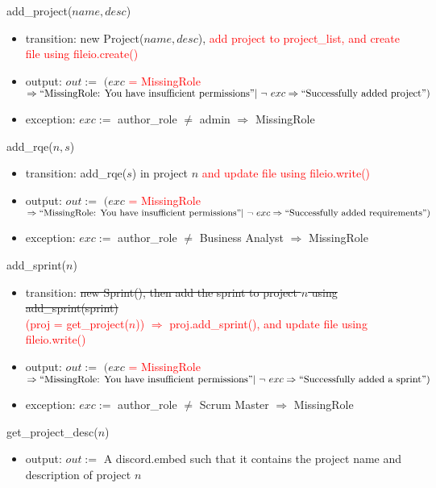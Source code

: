 \documentclass[12pt, titlepage]{article}
\begin{document}
\noindent add\_project($name, desc$)
\begin{itemize}
    \item transition: new Project($name, desc$), \textcolor{red}{add project to project\_list, and create file using fileio.create()}
    \item output: $out :=$ $(exc$ \textcolor{red}{= MissingRole} $\Rightarrow ``\text{MissingRole: You have insufficient permissions}"\\ |\ \lnot\ exc \Rightarrow ``\text{Successfully added project}")$
    \item exception: $exc :=$ author\_role $\neq$ admin $\Rightarrow$ MissingRole
\end{itemize}

\noindent add\_rqe($n, s$)
\begin{itemize}
    \item transition: add\_rqe($s$) in project $n$ \textcolor{red}{and update file using fileio.write()}
    \item output: $out :=$ $(exc$ \textcolor{red}{= MissingRole} $\Rightarrow ``\text{MissingRole: You have insufficient permissions}"\\ |\ \lnot\ exc \Rightarrow ``\text{Successfully added requirements}")$
    \item exception: $exc :=$ author\_role $\neq$ Business Analyst $\Rightarrow$ MissingRole
\end{itemize}

\noindent add\_sprint($n$)
\begin{itemize}
    \item transition: \sout{new Sprint(), then add the sprint to project $n$ using add\_sprint(sprint)}\\ \textcolor{red}{(proj = get\_project($n$)) $\Rightarrow$ proj.add\_sprint(), and update file using fileio.write()} 
    
    \item output: $out :=$ $(exc$ \textcolor{red}{= MissingRole} $\Rightarrow ``\text{MissingRole: You have insufficient permissions}"\\ |\ \lnot\ exc \Rightarrow ``\text{Successfully added a sprint}")$
    
    \item exception: $exc :=$ author\_role $\neq$ Scrum Master $\Rightarrow$ MissingRole
\end{itemize}

\noindent get\_project\_desc($n$)
\begin{itemize}
    \item output: $out :=$ A discord.embed such that it contains the project name and description of project $n$
\end{itemize}
\end{document}
